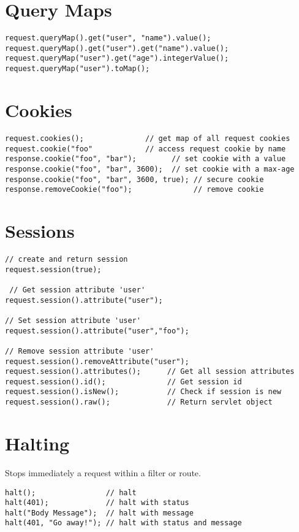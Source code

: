 \documentclass{report}
\begin{document}
\section{Query Maps}
\begin{verbatim}
request.queryMap().get("user", "name").value();
request.queryMap().get("user").get("name").value();
request.queryMap("user").get("age").integerValue();
request.queryMap("user").toMap();
\end{verbatim}


\section{Cookies}
\begin{verbatim}
request.cookies();              // get map of all request cookies
request.cookie("foo"            // access request cookie by name
response.cookie("foo", "bar");        // set cookie with a value
response.cookie("foo", "bar", 3600);  // set cookie with a max-age
response.cookie("foo", "bar", 3600, true); // secure cookie
response.removeCookie("foo");              // remove cookie
\end{verbatim}



\section{Sessions}
\begin{verbatim}
// create and return session
request.session(true);                

 // Get session attribute 'user'
request.session().attribute("user");

// Set session attribute 'user'
request.session().attribute("user","foo"); 

// Remove session attribute 'user'
request.session().removeAttribute("user"); 
request.session().attributes();      // Get all session attributes
request.session().id();              // Get session id
request.session().isNew();           // Check if session is new
request.session().raw();             // Return servlet object
\end{verbatim}


\section{Halting}
Stops immediately a request within a filter or route.
\begin{verbatim}
halt();                // halt 
halt(401);             // halt with status
halt("Body Message");  // halt with message
halt(401, "Go away!"); // halt with status and message
\end{verbatim}
\end{document}
